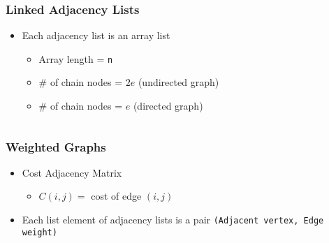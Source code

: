 \documentclass[newPxFont,sthlmFooter,nooffset]{beamer}
\begin{document}
\begin{frame}[t]
  \frametitle{Linked Adjacency Lists}
  \begin{itemize}
  \item Each adjacency list is an array list
    \begin{itemize}
    \item Array length = \texttt{n}
    \item $\#$ of chain nodes = $2e$ (undirected graph)
    \item $\#$ of chain nodes = $e$ (directed graph)
    \end{itemize}
  \end{itemize}
    \begin{columns}
      \begin{column}{0.3\textwidth}
      \end{column}
      \begin{column}{0.6\textwidth}
      \end{column}
    \end{columns}

\end{frame}


\begin{frame}[t]
  \frametitle{Weighted Graphs}
  \begin{itemize}
  \item Cost Adjacency Matrix
    \begin{itemize}
    \item $C(i, j) =$ cost of edge $(i, j)$
    \end{itemize}
  \item Each list element of adjacency lists is a pair \texttt{(Adjacent vertex, Edge weight)}
  \end{itemize}
\end{frame}
\end{document}
